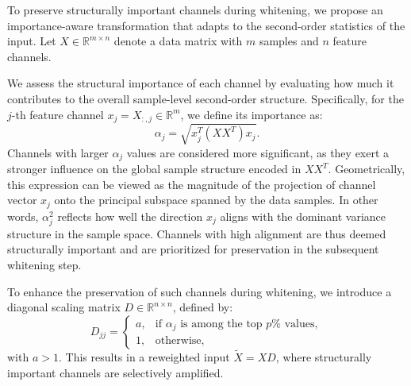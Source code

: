 \documentclass[11pt]{article}
\begin{document}






To preserve structurally important channels during whitening, we propose an importance-aware transformation that adapts to the second-order statistics of the input. Let \(X \in \mathbb{R}^{m \times n}\) denote a data matrix with \(m\) samples and \(n\) feature channels.

We assess the structural importance of each channel by evaluating how much it contributes to the overall sample-level second-order structure. Specifically, for the \(j\)-th feature channel \(x_j = X_{:,j} \in \mathbb{R}^m\), we define its importance as:
\begin{equation}
\alpha_j = \sqrt{x_j^{T} (X X^{T}) x_j}.
\end{equation}
Channels with larger \(\alpha_j\) values are considered more significant, as they exert a stronger influence on the global sample structure encoded in \(X X^T\). 
Geometrically, this expression can be viewed as the magnitude of the projection of channel vector \(x_j\) onto the principal subspace spanned by the data samples. In other words, \(\alpha_j^2\) reflects how well the direction \(x_j\) aligns with the dominant variance structure in the sample space. Channels with high alignment are thus deemed structurally important and are prioritized for preservation in the subsequent whitening step.

To enhance the preservation of such channels during whitening, we introduce a diagonal scaling matrix \(D \in \mathbb{R}^{n \times n}\), defined by:
\begin{equation}
D_{jj} = 
\begin{cases}
a, & \text{if } \alpha_j \text{ is among the top } p\% \text{ values}, \\
1, & \text{otherwise},
\end{cases}
\end{equation}
with $a > 1$.
This results in a reweighted input \(\tilde{X} = X D\), where structurally important channels are selectively amplified.
\end{document}

